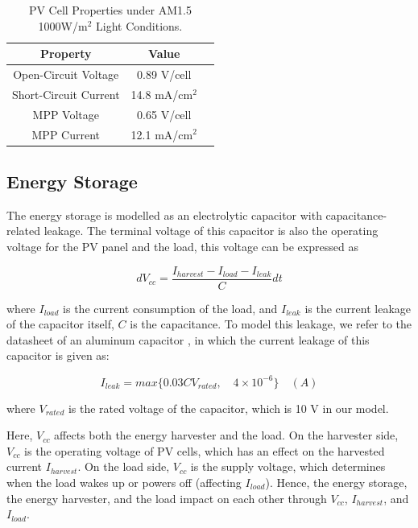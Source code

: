 \begin{table}[H]
    \caption{PV Cell Properties under AM1.5 1000W/m$^2$ Light Conditions.}
    \label{Table:pvcell}
    \centering
    \begin{tabular}{ccc}
    \toprule
    \textbf{Property} & \textbf{Value} \\
    \midrule
    Open-Circuit Voltage & 0.89 V/cell \\
    Short-Circuit Current & 14.8 mA/cm$^2$ \\
    MPP Voltage & 0.65 V/cell \\ 
    MPP Current & 12.1 mA/cm$^2$ \\
    \bottomrule
    \end{tabular}
\end{table}

\subsection{Energy Storage}

The energy storage is modelled as an electrolytic capacitor with capacitance-related leakage. The terminal voltage of this capacitor is also the operating voltage for the PV panel and the load, this voltage can be expressed as

\begin{equation}
    dV_{cc} = \frac{I_{harvest} - I_{load} - I_{leak}}{C} dt
\end{equation}

where $I_{load}$ is the current consumption of the load, and $I_{leak}$ is the current leakage of the capacitor itself, $C$ is the capacitance. To model this leakage, we refer to the datasheet of an aluminum capacitor \cite{alcapacitor}, in which the current leakage of this capacitor is given as:

\begin{equation}
    I_{leak} = max\{0.03 C V_{rated}, \quad 4 \times 10^{-6}\} \quad (A)
\end{equation}

where $V_{rated}$ is the rated voltage of the capacitor, which is 10 V in our model. 

Here, $V_{cc}$ affects both the energy harvester and the load. On the harvester side, $V_{cc}$ is the operating voltage of PV cells, which has an effect on the harvested current $I_{harvest}$. On the load side, $V_{cc}$ is the supply voltage, which determines when the load wakes up or powers off (affecting $I_{load}$). Hence, the energy storage, the energy harvester, and the load impact on each other through $V_{cc}$, $I_{harvest}$, and $I_{load}$. 

